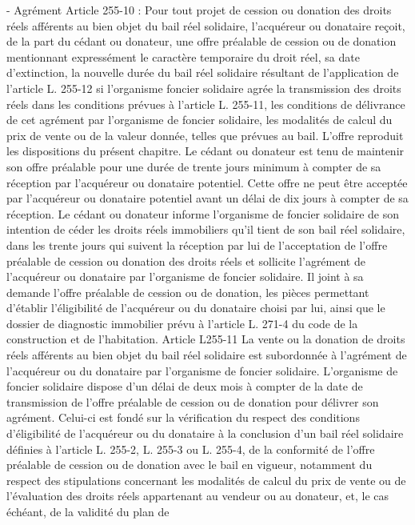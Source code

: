 \documentclass[11pt,a4paper]{report}
\begin{document}
- Agrément
Article 255-10 : Pour tout projet de cession ou donation des droits réels afférents au bien objet du bail réel
solidaire, l'acquéreur ou donataire reçoit, de la part du cédant ou donateur, une offre préalable de cession ou de
donation mentionnant expressément le caractère temporaire du droit réel, sa date d'extinction, la nouvelle durée
du bail réel solidaire résultant de l'application de l'article L. 255-12 si l'organisme foncier solidaire agrée la
transmission des droits réels dans les conditions prévues à l'article L. 255-11, les conditions de délivrance de cet
agrément par l'organisme de foncier solidaire, les modalités de calcul du prix de vente ou de la valeur donnée,
telles que prévues au bail. L'offre reproduit les dispositions du présent chapitre.
Le cédant ou donateur est tenu de maintenir son offre préalable pour une durée de trente jours minimum à
compter de sa réception par l'acquéreur ou donataire potentiel. Cette offre ne peut être acceptée par l'acquéreur
ou donataire potentiel avant un délai de dix jours à compter de sa réception.
Le cédant ou donateur informe l'organisme de foncier solidaire de son intention de céder les droits réels
immobiliers qu'il tient de son bail réel solidaire, dans les trente jours qui suivent la réception par lui de
l'acceptation de l'offre préalable de cession ou donation des droits réels et sollicite l'agrément de l'acquéreur ou
donataire par l'organisme de foncier solidaire. Il joint à sa demande l'offre préalable de cession ou de donation,
les pièces permettant d'établir l'éligibilité de l'acquéreur ou du donataire choisi par lui, ainsi que le dossier de
diagnostic immobilier prévu à l'article L. 271-4 du code de la construction et de l'habitation.
Article L255-11
La vente ou la donation de droits réels afférents au bien objet du bail réel solidaire est subordonnée à
l'agrément de l'acquéreur ou du donataire par l'organisme de foncier solidaire.
L'organisme de foncier solidaire dispose d'un délai de deux mois à compter de la date de transmission de l'offre
préalable de cession ou de donation pour délivrer son agrément. Celui-ci est fondé sur la vérification du respect
des conditions d'éligibilité de l'acquéreur ou du donataire à la conclusion d'un bail réel solidaire définies à
l'article L. 255-2, L. 255-3 ou L. 255-4, de la conformité de l'offre préalable de cession ou de donation avec le
bail en vigueur, notamment du respect des stipulations concernant les modalités de calcul du prix de vente ou de
l'évaluation des droits réels appartenant au vendeur ou au donateur, et, le cas échéant, de la validité du plan de
\end{document}
